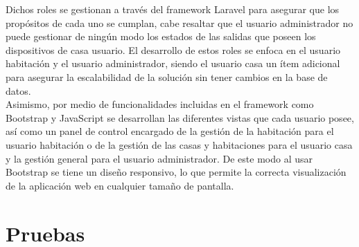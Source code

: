 Dichos roles se gestionan a través del framework Laravel para asegurar que los propósitos de cada uno se cumplan, cabe resaltar que el usuario administrador no puede gestionar de ningún modo los estados de las salidas que poseen los dispositivos de casa usuario. El desarrollo de estos roles se enfoca en el usuario habitación y el usuario administrador, siendo el usuario casa un ítem adicional para asegurar la escalabilidad de la solución sin tener cambios en la base de datos.\\

Asimismo, por medio de funcionalidades incluidas en el framework como Bootstrap y JavaScript se desarrollan las diferentes vistas que cada usuario posee, así como un panel de control encargado de la gestión de la habitación para el usuario habitación o de la gestión de las casas y habitaciones para el usuario casa y la gestión general para el usuario administrador. De este modo al usar Bootstrap se tiene un diseño responsivo, lo que permite la correcta visualización de la aplicación web en cualquier tamaño de pantalla.\\

\section{Pruebas}

